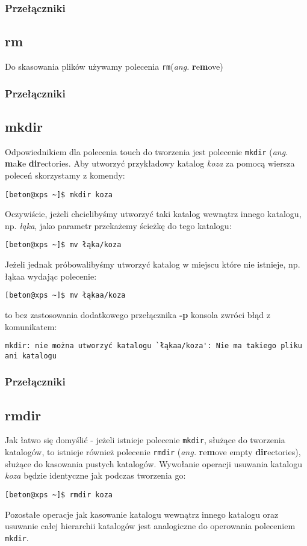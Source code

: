 \subsubsection*{Przełączniki}

\subsection{rm}
Do skasowania plików używamy polecenia \texttt{rm}(\textit{ang.} \textbf{r}e\textbf{m}ove)
\subsubsection*{Przełączniki}

\subsection{mkdir}
Odpowiednikiem dla polecenia touch do tworzenia jest polecenie \texttt{mkdir} (\textit{ang.} \textbf{m}a\textbf{k}e \textbf{dir}ectories. Aby utworzyć przykładowy katalog \textit{koza} za pomocą wiersza poleceń skorzystamy z komendy:
\begin{verbatim}
[beton@xps ~]$ mkdir koza
\end{verbatim}
Oczywiście, jeżeli chcielibyśmy utworzyć taki katalog wewnątrz innego katalogu, np. \textit{łąka}, jako parametr przekażemy ścieżkę do tego katalogu:
\begin{verbatim}
[beton@xps ~]$ mv łąka/koza
\end{verbatim}
Jeżeli jednak próbowalibyśmy utworzyć katalog w miejscu które nie istnieje, np. łąkaa wydając polecenie:
\begin{verbatim}
[beton@xps ~]$ mv łąkaa/koza
\end{verbatim}
to bez zastosowania dodatkowego przełącznika \textbf{-p} konsola zwróci błąd z komunikatem:
\begin{verbatim}
mkdir: nie można utworzyć katalogu `łąkaa/koza': Nie ma takiego pliku ani katalogu
\end{verbatim}
\subsubsection*{Przełączniki}

\subsection{rmdir}
Jak łatwo się domyślić - jeżeli istnieje polecenie \texttt{mkdir}, służące do tworzenia katalogów, to istnieje również polecenie \texttt{rmdir} (\textit{ang.} \textbf{r}e\textbf{m}ove empty \textbf{dir}ectories), służące do kasowania pustych katalogów. Wywołanie operacji usuwania katalogu \textit{koza} będzie identyczne jak podczas tworzenia go:
\begin{verbatim}
[beton@xps ~]$ rmdir koza
\end{verbatim}
Pozostałe operacje jak kasowanie katalogu wewnątrz innego katalogu oraz usuwanie całej hierarchii katalogów jest analogiczne do operowania poleceniem \texttt{mkdir}.
\newline
